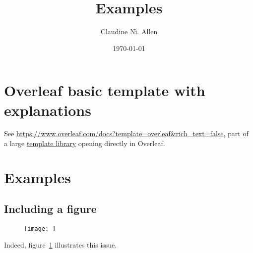 
%
%
\title{Examples}
\author{Claudine Nì. Allen}
\date{\today}

%

%
\section{Overleaf basic template with explanations}
See \url{https://www.overleaf.com/docs?template=overleaf&rich_text=false}, part of a large \href{https://www.overleaf.com/latex/templates}{template library} opening directly in Overleaf.

\section*{Examples} %

\subsection{Including a figure}
\begin{figure}[h] %
    \centering
    \texttt{[image: ]} %
    \caption{}
    \label{fig:} %
\end{figure}
\lipsum[1][1] Indeed, figure~\ref{fig:} illustrates this issue.

